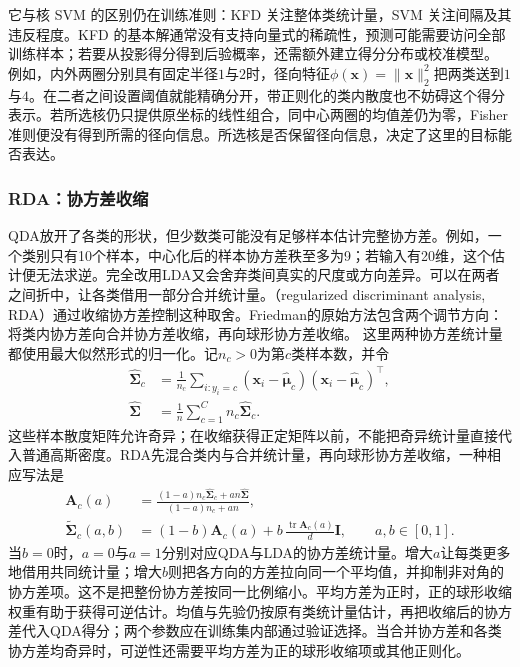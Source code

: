 它与核 SVM 的区别仍在训练准则：KFD 关注整体类统计量，SVM 关注间隔及其违反程度。KFD 的基本解通常没有支持向量式的稀疏性，预测可能需要访问全部训练样本；若要从投影得分得到后验概率，还需额外建立得分分布或校准模型。
例如，内外两圈分别具有固定半径$1$与$2$时，径向特征$\phi(\bm x)=\|\bm x\|_2^2$把两类送到$1$与$4$。在二者之间设置阈值就能精确分开，带正则化的类内散度也不妨碍这个得分表示。若所选核仍只提供原坐标的线性组合，同中心两圈的均值差仍为零，Fisher准则便没有得到所需的径向信息。所选核是否保留径向信息，决定了这里的目标能否表达。

\subsubsection{RDA：协方差收缩}

QDA放开了各类的形状，但少数类可能没有足够样本估计完整协方差。例如，一个类别只有10个样本，中心化后的样本协方差秩至多为9；若输入有20维，这个估计便无法求逆。完全改用LDA又会舍弃类间真实的尺度或方向差异。可以在两者之间折中，让各类借用一部分合并统计量。（regularized discriminant analysis, RDA）通过收缩协方差控制这种取舍。Friedman的原始方法包含两个调节方向：将类内协方差向合并协方差收缩，再向球形协方差收缩。
这里两种协方差统计量都使用最大似然形式的归一化。记$n_c>0$为第$c$类样本数，并令
\[
  \begin{aligned}
    \hat{\bm{\Sigma}}_c
      &=\frac{1}{n_c}\sum_{i:y_i=c}
        (\bm{x}_i-\hat{\bm{\mu}}_c)
        (\bm{x}_i-\hat{\bm{\mu}}_c)^{\top},\\
    \hat{\bm{\Sigma}}
      &=\frac1n\sum_{c=1}^{C}n_c\hat{\bm{\Sigma}}_c.
  \end{aligned}
\]
这些样本散度矩阵允许奇异；在收缩获得正定矩阵以前，不能把奇异统计量直接代入普通高斯密度。RDA先混合类内与合并统计量，再向球形协方差收缩，一种相应写法是
\begin{equation}
  \begin{aligned}
    \bm{A}_c(a)
      &=\frac{(1-a)n_c\hat{\bm{\Sigma}}_c+an\hat{\bm{\Sigma}}}
              {(1-a)n_c+an},\\
    \tilde{\bm{\Sigma}}_c(a,b)
      &=(1-b)\bm{A}_c(a)
        +b\,\frac{\operatorname{tr}\bm{A}_c(a)}{d}\bm{I},
        \qquad a,b\in[0,1].
  \end{aligned}
  \label{eq:classification-rda}
\end{equation}
当$b=0$时，$a=0$与$a=1$分别对应QDA与LDA的协方差统计量。增大$a$让每类更多地借用共同统计量；增大$b$则把各方向的方差拉向同一个平均值，并抑制非对角的协方差项。这不是把整份协方差按同一比例缩小。平均方差为正时，正的球形收缩权重有助于获得可逆估计。均值与先验仍按原有类统计量估计，再把收缩后的协方差代入QDA得分；两个参数应在训练集内部通过验证选择。当合并协方差和各类协方差均奇异时，可逆性还需要平均方差为正的球形收缩项或其他正则化。

